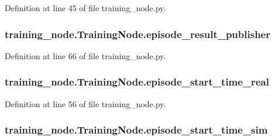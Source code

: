 Definition at line 45 of file training\+\_\+node.\+py.

\subsubsection[{\texorpdfstring{episode\+\_\+result\+\_\+publisher}{episode_result_publisher}}]{\setlength{\rightskip}{0pt plus 5cm}training\+\_\+node.\+Training\+Node.\+episode\+\_\+result\+\_\+publisher}\hypertarget{classtraining__node_1_1_training_node_ada9e747d02401d1492e4d1ef67f19244}{}\label{classtraining__node_1_1_training_node_ada9e747d02401d1492e4d1ef67f19244}


Definition at line 66 of file training\+\_\+node.\+py.

\subsubsection[{\texorpdfstring{episode\+\_\+start\+\_\+time\+\_\+real}{episode_start_time_real}}]{\setlength{\rightskip}{0pt plus 5cm}training\+\_\+node.\+Training\+Node.\+episode\+\_\+start\+\_\+time\+\_\+real}\hypertarget{classtraining__node_1_1_training_node_a5c2ed624728ef2cd34671bd10cbf8f3b}{}\label{classtraining__node_1_1_training_node_a5c2ed624728ef2cd34671bd10cbf8f3b}


Definition at line 56 of file training\+\_\+node.\+py.

\subsubsection[{\texorpdfstring{episode\+\_\+start\+\_\+time\+\_\+sim}{episode_start_time_sim}}]{\setlength{\rightskip}{0pt plus 5cm}training\+\_\+node.\+Training\+Node.\+episode\+\_\+start\+\_\+time\+\_\+sim}\hypertarget{classtraining__node_1_1_training_node_a98fc9d6b00aa02587d5c53e56f20ce07}{}\label{classtraining__node_1_1_training_node_a98fc9d6b00aa02587d5c53e56f20ce07}


